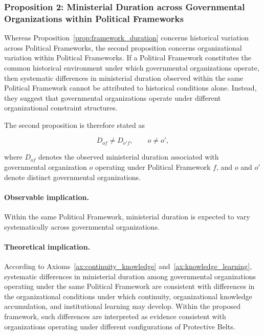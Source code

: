 \documentclass[doc, 12pt, a4paper,floatsintext]{apa7}
\begin{document}
\subsubsection{Proposition 2: Ministerial Duration across Governmental Organizations within Political Frameworks}
%
Whereas Proposition~\ref{prop:framework_duration} concerns historical variation across Political Frameworks, the second proposition concerns organizational variation within Political Frameworks. If a Political Framework constitutes the common historical environment under which governmental organizations operate, then systematic differences in ministerial duration observed within the same Political Framework cannot be attributed to historical conditions alone. Instead, they suggest that governmental organizations operate under different organizational constraint structures.

The second proposition is therefore stated as

\begin{equation}
\tag{P2}
D_{of}\neq D_{o'f},
\qquad
o\neq o',
\label{prop:portfolio_duration}
\end{equation}

where $D_{of}$ denotes the observed ministerial duration associated with governmental organization $o$ operating under Political Framework $f$, and $o$ and $o'$ denote distinct governmental organizations.

\paragraph{Observable implication.}

Within the same Political Framework, ministerial duration is expected to vary systematically across governmental organizations.

\paragraph{Theoretical implication.}

According to Axioms~\ref{ax:continuity_knowledge} and~\ref{ax:knowledge_learning}, systematic differences in ministerial duration among governmental organizations operating under the same Political Framework are consistent with differences in the organizational conditions under which continuity, organizational knowledge accumulation, and institutional learning may develop. Within the proposed framework, such differences are interpreted as evidence consistent with organizations operating under different configurations of Protective Belts.
\end{document}
